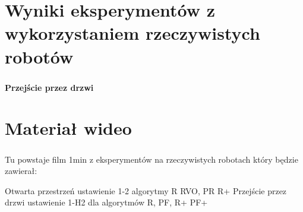 \section*{Wyniki eksperymentów z wykorzystaniem  rzeczywistych robotów}
\begin{frame}
\frametitle{\secname}
\framesubtitle{Przejście przez drzwi}
\begin{figure}[ht] %
	\captionsetup[subfigure]{labelformat=empty}
	\centering
\end{figure}


\end{frame}

\section*{Materiał wideo}
\begin{frame}
\frametitle{\secname}

Tu powstaje film 1min z eksperymentów na rzeczywistych robotach który będzie zawierał:

Otwarta przestrzeń ustawienie 1-2 algorytmy R RVO, PR R+
Przejście przez drzwi ustawienie 1-H2 dla algorytmów R, PF, R+ PF+
\end{frame}
